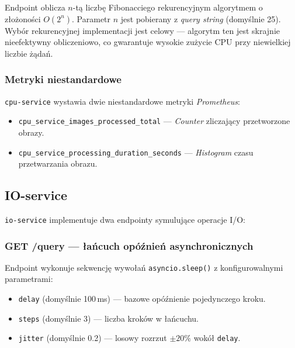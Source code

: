 Endpoint oblicza $n$-tą liczbę Fibonacciego rekurencyjnym algorytmem o złożoności $O(2^n)$. Parametr $n$ jest pobierany z \textit{query string} (domyślnie 25). Wybór rekurencyjnej implementacji jest celowy — algorytm ten jest skrajnie nieefektywny obliczeniowo, co gwarantuje wysokie zużycie CPU przy niewielkiej liczbie żądań.



\subsubsection{Metryki niestandardowe}

\texttt{cpu-service} wystawia dwie niestandardowe metryki \textit{Prometheus}:
\begin{itemize}
  \item \texttt{cpu\_service\_images\_processed\_total} — \textit{Counter} zliczający przetworzone obrazy.
  \item \texttt{cpu\_service\_processing\_duration\_seconds} — \textit{Histogram} czasu przetwarzania obrazu.
\end{itemize}

\subsection{IO-service}

\texttt{io-service} implementuje dwa endpointy symulujące operacje I/O:

\subsubsection{GET /query — łańcuch opóźnień asynchronicznych}

Endpoint wykonuje sekwencję wywołań \texttt{asyncio.sleep()} z konfigurowalnymi parametrami:

\begin{itemize}
  \item \texttt{delay} (domyślnie 100\,ms) — bazowe opóźnienie pojedynczego kroku.
  \item \texttt{steps} (domyślnie 3) — liczba kroków w łańcuchu.
  \item \texttt{jitter} (domyślnie 0.2) — losowy rozrzut $\pm20\%$ wokół \texttt{delay}.
\end{itemize}

